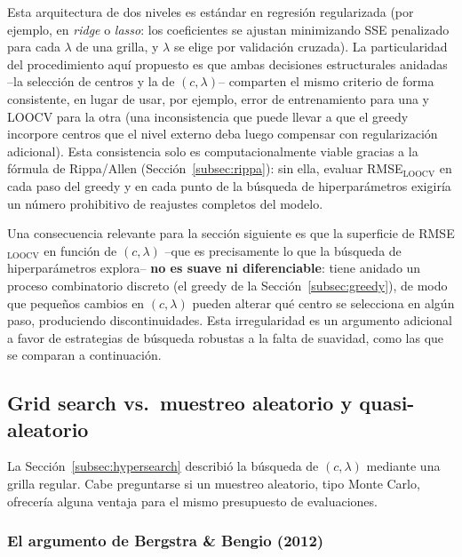 \documentclass[11pt,a4paper]{article}
\begin{document}
Esta arquitectura de dos niveles es est\'andar en regresi\'on regularizada
(por ejemplo, en \emph{ridge} o \emph{lasso}: los coeficientes se ajustan
minimizando SSE penalizado para cada $\lambda$ de una grilla, y $\lambda$ se
elige por validaci\'on cruzada). La particularidad del procedimiento aqu\'i
propuesto es que ambas decisiones estructurales anidadas --la selecci\'on de
centros y la de $(c,\lambda)$-- comparten el mismo criterio de forma
consistente, en lugar de usar, por ejemplo, error de entrenamiento para una y
LOOCV para la otra (una inconsistencia que puede llevar a que el greedy
incorpore centros que el nivel externo deba luego compensar con
regularizaci\'on adicional). Esta consistencia solo es computacionalmente
viable gracias a la f\'ormula de Rippa/Allen (Secci\'on~\ref{subsec:rippa}):
sin ella, evaluar RMSE$_{\text{LOOCV}}$ en cada paso del greedy y en cada
punto de la b\'usqueda de hiperpar\'ametros exigir\'ia un n\'umero
prohibitivo de reajustes completos del modelo.

Una consecuencia relevante para la secci\'on siguiente es que la superficie
de RMSE$_{\text{LOOCV}}$ en funci\'on de $(c,\lambda)$ --que es precisamente
lo que la b\'usqueda de hiperpar\'ametros explora-- \textbf{no es suave ni
diferenciable}: tiene anidado un proceso combinatorio discreto (el greedy de
la Secci\'on~\ref{subsec:greedy}), de modo que peque\~nos cambios en
$(c,\lambda)$ pueden alterar qu\'e centro se selecciona en alg\'un paso,
produciendo discontinuidades. Esta irregularidad es un argumento adicional a
favor de estrategias de b\'usqueda robustas a la falta de suavidad, como las
que se comparan a continuaci\'on.

\subsection{Grid search vs.\ muestreo aleatorio y quasi-aleatorio}
\label{subsec:grid_vs_random}

La Secci\'on~\ref{subsec:hypersearch} describi\'o la b\'usqueda de
$(c,\lambda)$ mediante una grilla regular. Cabe preguntarse si un muestreo
aleatorio, tipo Monte Carlo, ofrecer\'ia alguna ventaja para el mismo
presupuesto de evaluaciones.

\subsubsection{El argumento de Bergstra \& Bengio (2012)}
\end{document}

